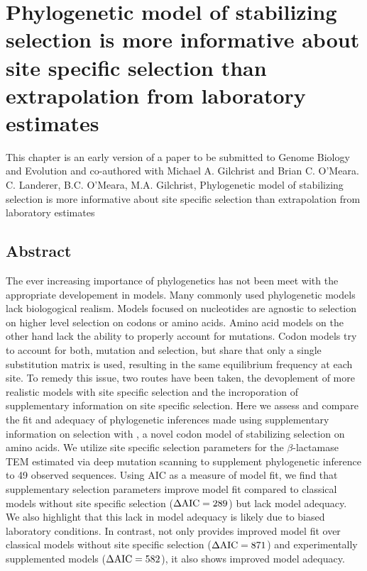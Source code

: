 \chapter{Phylogenetic model of stabilizing selection is more informative about site specific selection than extrapolation from laboratory estimates} 
\label{ch:phylogeny}

\clearpage
\pagebreak

This chapter is an early version of a paper to be submitted to Genome Biology and Evolution and co-authored with Michael A. Gilchrist and Brian C. O'Meara.\\
\newline
\newline
C. Landerer, B.C. O'Meara, M.A. Gilchrist, Phylogenetic model of stabilizing selection is more informative about site specific selection than extrapolation from laboratory estimates

\section{Abstract}
The ever increasing importance of phylogenetics has not been meet with the appropriate developement in models.
Many commonly used phylogenetic models lack biologogical realism.
Models focused on nucleotides are agnostic to selection on higher level selection on codons or amino acids.
Amino acid models on the other hand lack the ability to properly account for mutations.
Codon models try to account for both, mutation and selection, but share that only a single substitution matrix is used, resulting in the same equilibrium frequency at each site.
To remedy this issue, two routes have been taken, the devoplement of more realistic models with site specific selection and the incroporation of supplementary information on site specific selection.
Here we assess and compare the fit and adequacy of phylogenetic inferences made using supplementary information on selection with \selac, a novel codon model of stabilizing selection on amino acids.
We utilize site specific selection parameters for the $\beta$-lactamase TEM estimated via deep mutation scanning to supplement phylogenetic inference to 49 observed sequences.
Using AIC as a measure of model fit, we find that supplementary selection parameters improve model fit compared to classical models without site specific selection ($\Delta\text{AIC} = 289$) but lack model adequacy.
We also highlight that this lack in model adequacy is likely due to biased laboratory conditions.
In contrast, \selac not only provides improved model fit over classical models without site specific selection ($\Delta\text{AIC} = 871$) and experimentally supplemented models ($\Delta\text{AIC} = 582$), it also shows improved model adequacy.
\newpage

